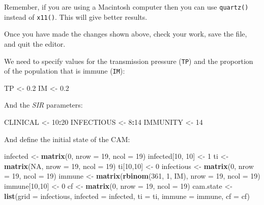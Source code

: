 \documentclass[12pt,a4paper]{book}
\newenvironment{Shaded}{\begin{snugshade}}{\end{snugshade}}
\newcommand{\DataTypeTok}[1]{\textcolor[rgb]{0.13,0.29,0.53}{#1}}
\newcommand{\DecValTok}[1]{\textcolor[rgb]{0.00,0.00,0.81}{#1}}
\newcommand{\FloatTok}[1]{\textcolor[rgb]{0.00,0.00,0.81}{#1}}
\newcommand{\KeywordTok}[1]{\textcolor[rgb]{0.13,0.29,0.53}{\textbf{#1}}}
\newcommand{\NormalTok}[1]{#1}
\newcommand{\OperatorTok}[1]{\textcolor[rgb]{0.81,0.36,0.00}{\textbf{#1}}}
\newcommand{\OtherTok}[1]{\textcolor[rgb]{0.56,0.35,0.01}{#1}}
\newcommand{\StringTok}[1]{\textcolor[rgb]{0.31,0.60,0.02}{#1}}
\theoremstyle{definition}
\theoremstyle{definition}
\theoremstyle{definition}
\theoremstyle{remark}
\begin{document}
Remember, if you are using a Macintosh computer then you can use
\texttt{quartz()} instead of \texttt{x11()}. This will give better
results.

Once you have made the changes shown above, check your work, save the
file, and quit the editor.

We need to specify values for the transmission pressure (\texttt{TP})
and the proportion of the population that is immune (\texttt{IM}):

\begin{Shaded}
\begin{Highlighting}[]
\NormalTok{TP <-}\StringTok{ }\FloatTok{0.2}
\NormalTok{IM <-}\StringTok{ }\FloatTok{0.2}
\end{Highlighting}
\end{Shaded}

And the \emph{SIR} parameters:

\begin{Shaded}
\begin{Highlighting}[]
\NormalTok{CLINICAL <-}\StringTok{ }\DecValTok{10}\OperatorTok{:}\DecValTok{20}
\NormalTok{INFECTIOUS <-}\StringTok{ }\DecValTok{8}\OperatorTok{:}\DecValTok{14}
\NormalTok{IMMUNITY <-}\StringTok{ }\DecValTok{14}
\end{Highlighting}
\end{Shaded}

And define the initial state of the CAM:

\begin{Shaded}
\begin{Highlighting}[]
\NormalTok{infected <-}\StringTok{ }\KeywordTok{matrix}\NormalTok{(}\DecValTok{0}\NormalTok{, }\DataTypeTok{nrow =} \DecValTok{19}\NormalTok{, }\DataTypeTok{ncol =} \DecValTok{19}\NormalTok{)}
\NormalTok{infected[}\DecValTok{10}\NormalTok{, }\DecValTok{10}\NormalTok{] <-}\StringTok{ }\DecValTok{1}
\NormalTok{ti <-}\StringTok{ }\KeywordTok{matrix}\NormalTok{(}\OtherTok{NA}\NormalTok{, }\DataTypeTok{nrow =} \DecValTok{19}\NormalTok{, }\DataTypeTok{ncol =} \DecValTok{19}\NormalTok{)}
\NormalTok{ti[}\DecValTok{10}\NormalTok{,}\DecValTok{10}\NormalTok{] <-}\StringTok{ }\DecValTok{0}
\NormalTok{infectious <-}\StringTok{ }\KeywordTok{matrix}\NormalTok{(}\DecValTok{0}\NormalTok{, }\DataTypeTok{nrow =} \DecValTok{19}\NormalTok{, }\DataTypeTok{ncol =} \DecValTok{19}\NormalTok{)}
\NormalTok{immune <-}\StringTok{ }\KeywordTok{matrix}\NormalTok{(}\KeywordTok{rbinom}\NormalTok{(}\DecValTok{361}\NormalTok{, }\DecValTok{1}\NormalTok{, IM), }\DataTypeTok{nrow =} \DecValTok{19}\NormalTok{, }\DataTypeTok{ncol =} \DecValTok{19}\NormalTok{)}
\NormalTok{immune[}\DecValTok{10}\NormalTok{,}\DecValTok{10}\NormalTok{] <-}\StringTok{ }\DecValTok{0}
\NormalTok{cf <-}\StringTok{ }\KeywordTok{matrix}\NormalTok{(}\DecValTok{0}\NormalTok{, }\DataTypeTok{nrow =} \DecValTok{19}\NormalTok{, }\DataTypeTok{ncol =} \DecValTok{19}\NormalTok{)}
\NormalTok{cam.state <-}\StringTok{  }\KeywordTok{list}\NormalTok{(}\DataTypeTok{grid =}\NormalTok{ infectious, }\DataTypeTok{infected =}\NormalTok{ infected, }\DataTypeTok{ti =}\NormalTok{ ti,}
                   \DataTypeTok{immune =}\NormalTok{ immune, }\DataTypeTok{cf =}\NormalTok{ cf)}
\end{Highlighting}
\end{Shaded}
\end{document}
